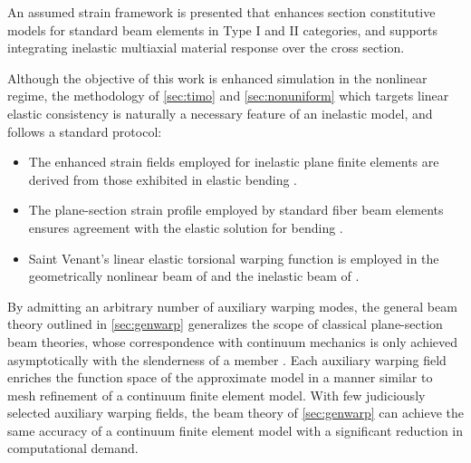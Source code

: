 An assumed strain framework is presented that enhances section constitutive models for standard beam elements in Type I and II categories, and supports integrating inelastic multiaxial material response over the cross section. 




\begin{remark}\label{rem:inelastic-consistency}
Although the objective of this work is enhanced simulation in the nonlinear regime, the methodology of \cref{sec:timo} and \cref{sec:nonuniform} which targets linear elastic consistency is naturally a necessary feature of an inelastic model, and follows a standard protocol:
\begin{itemize}
    \item The enhanced strain fields employed for inelastic plane finite elements \citep{simo1990class} are derived from those exhibited in elastic bending \citep{wilson1990use}.
    \item The plane-section strain profile employed by standard fiber beam elements \citep{spacone1992beam} ensures agreement with the elastic solution for bending  \citep[Art. 87]{love1944treatise}.
    \item Saint Venant's linear elastic torsional warping function is employed in the geometrically nonlinear beam of \citep{simo1991geometricallyexact} and the inelastic beam of \citep{gruttmann2000theory}.
\end{itemize}
\end{remark}

\begin{remark}
By admitting an arbitrary number of auxiliary warping modes, the general beam theory outlined in \cref{sec:genwarp} generalizes the scope of classical plane-section beam theories, whose correspondence with continuum mechanics is only achieved asymptotically with the slenderness of a member \citep{parker1979asymptotic,marigo2006hierarchy,mielke1988saintvenant}. %
Each auxiliary warping field enriches the function space of the approximate model in a manner similar to mesh refinement of a continuum finite element model.
With few judiciously selected auxiliary warping fields, the beam theory of \cref{sec:genwarp} can achieve the same accuracy of a continuum finite element model with a significant reduction in computational demand. 
\end{remark}


